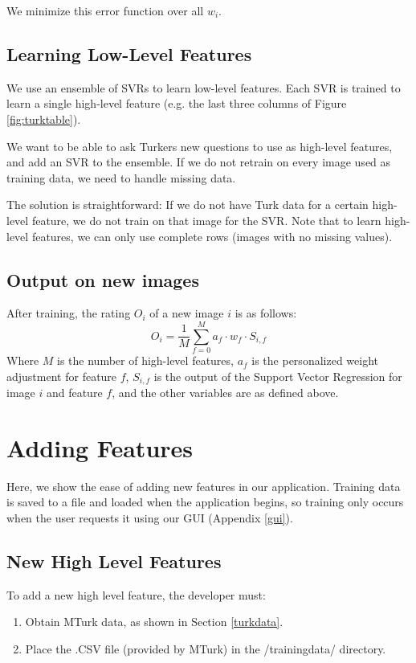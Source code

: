 \documentclass[11pt,letter]{article}
\begin{document}
We minimize this error function over all $w_i$.

\subsection{Learning Low-Level Features}
\label{llfeat}
We use an ensemble of SVRs to learn low-level features. Each SVR is trained to learn a single high-level feature (e.g. the last three columns of Figure \ref{fig:turktable}).

We want to be able to ask Turkers new questions to use as high-level features, and add an SVR to the ensemble. If we do not retrain on every image used as training data, we need to handle missing data.

The solution is straightforward: If we do not have Turk data for a certain high-level feature, we do not train on that image for the SVR. Note that to learn high-level features, we can only use complete rows (images with no missing values).

\subsection{Output on new images}
After training, the rating $O_i$ of a new image $i$ is as follows:
\[
O_i=\frac{1}{M}\displaystyle\sum\limits_{f=0}^Ma_f \cdot w_f \cdot S_{i,f}
\]
Where $M$ is the number of high-level features, $a_f$ is the personalized weight adjustment for feature $f$, $S_{i,f}$ is the output of the Support Vector Regression for image $i$ and feature $f$, and the other variables are as defined above.

\section{Adding Features}
Here, we show the ease of adding new features in our application. Training data is saved to a file and loaded when the application begins, so training only occurs when the user requests it using our GUI (Appendix \ref{gui}).

\subsection{New High Level Features}
To add a new high level feature, the developer must:

\begin{enumerate}
\item Obtain MTurk data, as shown in Section \ref{turkdata}.
\item Place the .CSV file (provided by MTurk) in the /trainingdata/ directory.
\end{enumerate}
\end{document}
